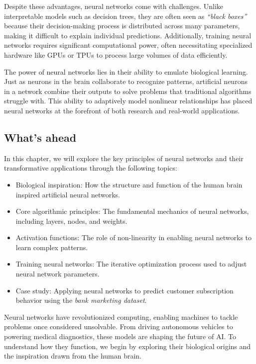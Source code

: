 \documentclass[
  11pt,
]{book}
\providecommand{\tightlist}{%
  \setlength{\itemsep}{0pt}\setlength{\parskip}{0pt}}
\theoremstyle{definition}
\theoremstyle{definition}
\theoremstyle{definition}
\theoremstyle{definition}
\theoremstyle{remark}
\begin{document}
Despite these advantages, neural networks come with challenges. Unlike interpretable models such as decision trees, they are often seen as \emph{``black boxes''} because their decision-making process is distributed across many parameters, making it difficult to explain individual predictions. Additionally, training neural networks requires significant computational power, often necessitating specialized hardware like GPUs or TPUs to process large volumes of data efficiently.

The power of neural networks lies in their ability to emulate biological learning. Just as neurons in the brain collaborate to recognize patterns, artificial neurons in a network combine their outputs to solve problems that traditional algorithms struggle with. This ability to adaptively model nonlinear relationships has placed neural networks at the forefront of both research and real-world applications.

\subsection*{What's ahead}\label{whats-ahead}


In this chapter, we will explore the key principles of neural networks and their transformative applications through the following topics:

\begin{itemize}
\tightlist
\item
  Biological inspiration: How the structure and function of the human brain inspired artificial neural networks.\\
\item
  Core algorithmic principles: The fundamental mechanics of neural networks, including layers, nodes, and weights.\\
\item
  Activation functions: The role of non-linearity in enabling neural networks to learn complex patterns.\\
\item
  Training neural networks: The iterative optimization process used to adjust neural network parameters.\\
\item
  Case study: Applying neural networks to predict customer subscription behavior using the \emph{bank marketing dataset}.
\end{itemize}

Neural networks have revolutionized computing, enabling machines to tackle problems once considered unsolvable. From driving autonomous vehicles to powering medical diagnostics, these models are shaping the future of AI. To understand how they function, we begin by exploring their biological origins and the inspiration drawn from the human brain.
\end{document}
